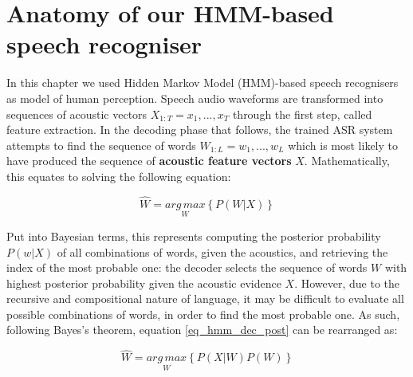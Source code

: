 








\section{Anatomy of our HMM-based speech recogniser}
In this chapter we used Hidden Markov Model (HMM)-based speech recognisers as model of human perception. 
Speech audio waveforms are transformed into sequences of acoustic vectors $X_{1:T} = x_{1}, ..., x_{T}$ through the first step, called feature extraction. In the decoding phase that follows, the trained ASR system attempts to find the sequence of words $W_{1:L} = w_{1}, ..., w_{L}$ which is most likely to have produced the sequence of \textbf{acoustic feature vectors} $X$.
Mathematically, this equates to solving the following equation:

\begin{equation}
  \widehat{W} = \underset{W}{arg\,max} \left \{  P(W|X)\right \}
  \label{eq_hmm_dec_post}
\end{equation}

Put into Bayesian terms, this represents computing the posterior probability $P(w|X)$ of all combinations of words, given the acoustics, and retrieving the index of the most probable one: the decoder selects the sequence of words $W$ with highest posterior probability given the acoustic evidence $X$. However, due to the recursive and compositional nature of language, it may be difficult to evaluate all possible combinations of words, in order to find the most probable one. As such, following Bayes's theorem, equation \ref{eq_hmm_dec_post} can be rearranged as:

\begin{equation}
  \widehat{W} = \underset{W}{arg\,max} \left \{  P(X|W)P(W)\right \}
  \label{eq_hmm_dec_post}
\end{equation}

